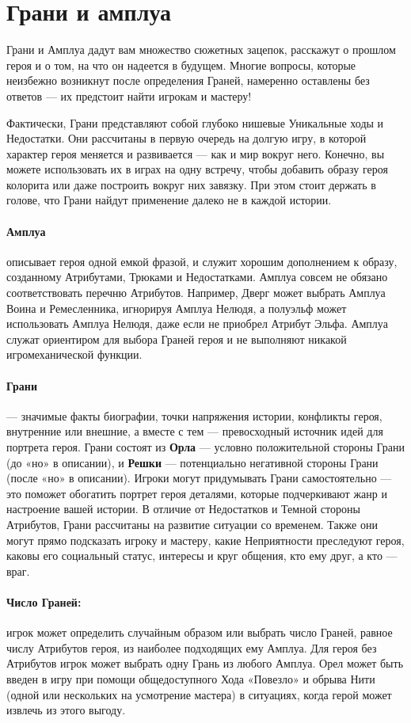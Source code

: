 \section{Грани и амплуа}
Грани и Амплуа дадут вам множество сюжетных зацепок, расскажут о прошлом героя и о том, на что он надеется в будущем. Многие вопросы, которые неизбежно возникнут после определения Граней, намеренно оставлены без ответов — их предстоит найти игрокам и мастеру!
\begin{tcolorbox}
Фактически, Грани представляют собой глубоко нишевые Уникальные ходы и Недостатки. Они рассчитаны в первую очередь на долгую игру, в которой характер героя меняется и развивается — как и мир вокруг него. Конечно, вы можете использовать их в играх на одну встречу, чтобы добавить образу героя колорита или даже построить вокруг них завязку. При этом стоит держать в голове, что Грани найдут применение далеко не в каждой истории.
\end{tcolorbox}
\paragraph{Амплуа} описывает героя одной емкой фразой, и служит хорошим дополнением к образу, созданному Атрибутами, Трюками и Недостатками. Амплуа совсем не обязано соответствовать перечню Атрибутов. Например, Дверг может выбрать Амплуа Воина и Ремесленника, игнорируя Амплуа Нелюдя, а полуэльф может использовать Амплуа Нелюдя, даже если не приобрел Атрибут Эльфа. Амплуа служат ориентиром для выбора Граней героя и не выполняют никакой игромеханической функции.
\paragraph{Грани} — значимые факты биографии, точки напряжения истории, конфликты героя, внутренние или внешние, а вместе с тем — превосходный источник идей для портрета героя. Грани состоят из \textbf{Орла} — условно положительной стороны Грани (до «но» в описании), и \textbf{Решки} — потенциально негативной стороны Грани (после «но» в описании). Игроки могут придумывать Грани самостоятельно — это поможет обогатить портрет героя деталями, которые подчеркивают жанр и настроение вашей истории.
В отличие от Недостатков и Темной стороны Атрибутов, Грани
рассчитаны на развитие ситуации со временем. Также они могут
прямо подсказать игроку и мастеру, какие Неприятности преследуют героя, каковы его социальный статус, интересы и круг общения, кто ему друг, а кто — враг.
\paragraph{Число Граней:} игрок может определить случайным образом или выбрать число Граней, равное числу Атрибутов героя, из наиболее подходящих ему Амплуа. Для героя без Атрибутов игрок может выбрать одну Грань из любого Амплуа. Орел может быть введен в игру при помощи общедоступного Хода
«Повезло» и обрыва Нити (одной или нескольких на усмотрение мастера) в ситуациях, когда герой может извлечь из этого выгоду.
